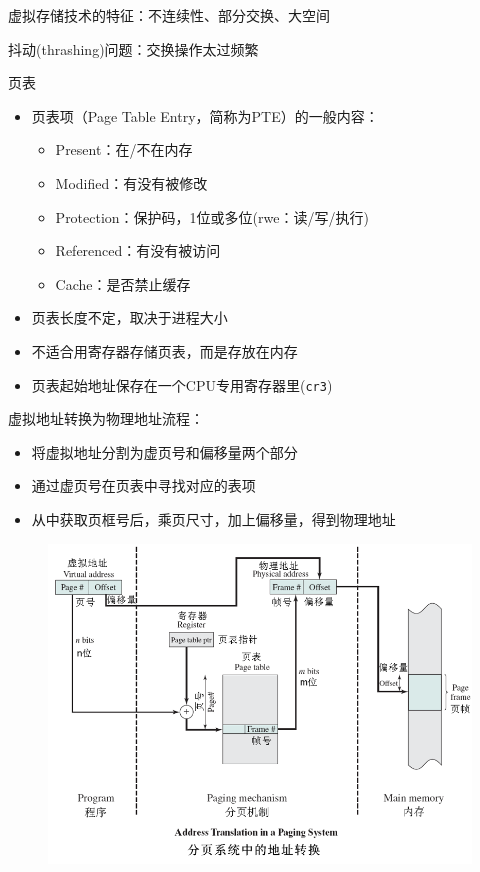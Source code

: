 虚拟存储技术的特征：不连续性、部分交换、大空间

抖动(thrashing)问题：交换操作太过频繁

页表
\begin{itemize}
\item 页表项（Page Table Entry，简称为PTE）的一般内容：
\begin{itemize}
\item Present：在/不在内存
\item Modified：有没有被修改
\item Protection：保护码，1位或多位(rwe：读/写/执行)
\item Referenced：有没有被访问
\item Cache：是否禁止缓存
\end{itemize}
\item 页表长度不定，取决于进程大小
\item 不适合用寄存器存储页表，而是存放在内存
\item 页表起始地址保存在一个CPU专用寄存器里(\verb'cr3')
\end{itemize}

虚拟地址转换为物理地址流程：
\begin{itemize}
    \item 将虚拟地址分割为虚页号和偏移量两个部分
    \item 通过虚页号在页表中寻找对应的表项
    \item 从中获取页框号后，乘页尺寸，加上偏移量，得到物理地址
\end{itemize}

\begin{figure}[H]
    \centering
    \includegraphics[width=0.8\linewidth]{fig/memory_address_transformation.png}
\end{figure}

